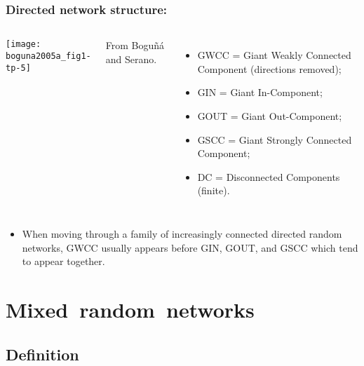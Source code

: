 \begin{frame}
  \frametitle{Directed network structure:}

  \begin{columns}
    \begin{center}
      \texttt{[image: boguna2005a\_fig1-tp-5]}
    \end{center}
    \small
    From Bogu\~{n}\'{a} and Serano.\cite{boguna2005a}
    \small
    \begin{itemize}
    \item 
      GWCC = Giant Weakly Connected Component (directions removed);
    \item 
      GIN = Giant In-Component;
    \item 
      GOUT = Giant Out-Component;
    \item 
      GSCC = Giant Strongly Connected Component;
    \item 
      DC = Disconnected Components (finite).
    \end{itemize}
  \end{columns}

  \begin{itemize}
  \item<2->
    When moving through a family of increasingly connected directed
    random networks, GWCC usually appears before GIN, GOUT, and GSCC which
    tend to appear together.\cite{newman2001b,boguna2005a}
  \end{itemize}

\end{frame}


\section{Mixed\ random\ networks}

\subsection{Definition}


